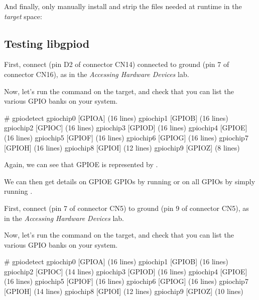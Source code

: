 And finally, only manually install and strip the files
needed at runtime in the {\em target} space:


\subsection{Testing libgpiod}

\if{}
First, connect  (pin D2 of connector CN14) connected
to ground (pin 7 of connector CN16), as in the
{\em Accessing Hardware Devices} lab.

Now, let's run the  command on the target, and check that
you can list the various GPIO banks on your system.

\begin{bashinput}
# gpiodetect
gpiochip0 [GPIOA] (16 lines)
gpiochip1 [GPIOB] (16 lines)
gpiochip2 [GPIOC] (16 lines)
gpiochip3 [GPIOD] (16 lines)
gpiochip4 [GPIOE] (16 lines)
gpiochip5 [GPIOF] (16 lines)
gpiochip6 [GPIOG] (16 lines)
gpiochip7 [GPIOH] (16 lines)
gpiochip8 [GPIOI] (12 lines)
gpiochip9 [GPIOZ] (8 lines)
\end{bashinput}

Again, we can see that GPIOE is represented by .

We can then get details on GPIOE GPIOs by running
 or on all GPIOs by simply running
.
\fi

\if{}

First, connect  (pin 7 of connector CN5) to ground
(pin 9 of connector CN5), as in the {\em Accessing Hardware Devices}
lab.

Now, let's run the  command on the target, and check that
you can list the various GPIO banks on your system.

\begin{bashinput}
# gpiodetect
gpiochip0 [GPIOA] (16 lines)
gpiochip1 [GPIOB] (16 lines)
gpiochip2 [GPIOC] (14 lines)
gpiochip3 [GPIOD] (16 lines)
gpiochip4 [GPIOE] (16 lines)
gpiochip5 [GPIOF] (16 lines)
gpiochip6 [GPIOG] (16 lines)
gpiochip7 [GPIOH] (14 lines)
gpiochip8 [GPIOI] (12 lines)
gpiochip9 [GPIOZ] (10 lines)
\end{bashinput}

